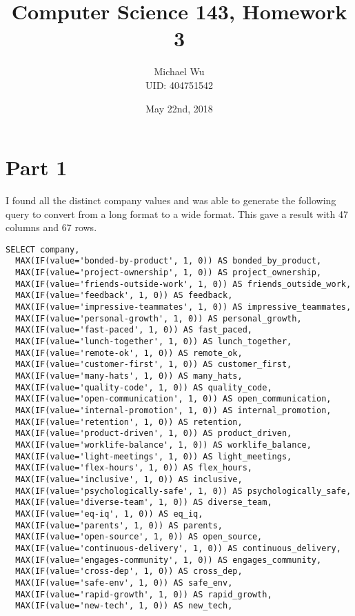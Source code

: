 \documentclass[12pt]{article}
\begin{document}
\title{Computer Science 143, Homework 3}
\date{May 22nd, 2018}
\author{Michael Wu\\UID: 404751542}
\maketitle

\section*{Part 1}

I found all the distinct company values and was able to generate the following query to convert from a long format to a wide format.
This gave a result with 47 columns and 67 rows.
{\footnotesize
\begin{verbatim}
SELECT company,
  MAX(IF(value='bonded-by-product', 1, 0)) AS bonded_by_product,
  MAX(IF(value='project-ownership', 1, 0)) AS project_ownership,
  MAX(IF(value='friends-outside-work', 1, 0)) AS friends_outside_work,
  MAX(IF(value='feedback', 1, 0)) AS feedback,
  MAX(IF(value='impressive-teammates', 1, 0)) AS impressive_teammates,
  MAX(IF(value='personal-growth', 1, 0)) AS personal_growth,
  MAX(IF(value='fast-paced', 1, 0)) AS fast_paced,
  MAX(IF(value='lunch-together', 1, 0)) AS lunch_together,
  MAX(IF(value='remote-ok', 1, 0)) AS remote_ok,
  MAX(IF(value='customer-first', 1, 0)) AS customer_first,
  MAX(IF(value='many-hats', 1, 0)) AS many_hats,
  MAX(IF(value='quality-code', 1, 0)) AS quality_code,
  MAX(IF(value='open-communication', 1, 0)) AS open_communication,
  MAX(IF(value='internal-promotion', 1, 0)) AS internal_promotion,
  MAX(IF(value='retention', 1, 0)) AS retention,
  MAX(IF(value='product-driven', 1, 0)) AS product_driven,
  MAX(IF(value='worklife-balance', 1, 0)) AS worklife_balance,
  MAX(IF(value='light-meetings', 1, 0)) AS light_meetings,
  MAX(IF(value='flex-hours', 1, 0)) AS flex_hours,
  MAX(IF(value='inclusive', 1, 0)) AS inclusive,
  MAX(IF(value='psychologically-safe', 1, 0)) AS psychologically_safe,
  MAX(IF(value='diverse-team', 1, 0)) AS diverse_team,
  MAX(IF(value='eq-iq', 1, 0)) AS eq_iq,
  MAX(IF(value='parents', 1, 0)) AS parents,
  MAX(IF(value='open-source', 1, 0)) AS open_source,
  MAX(IF(value='continuous-delivery', 1, 0)) AS continuous_delivery,
  MAX(IF(value='engages-community', 1, 0)) AS engages_community,
  MAX(IF(value='cross-dep', 1, 0)) AS cross_dep,
  MAX(IF(value='safe-env', 1, 0)) AS safe_env,
  MAX(IF(value='rapid-growth', 1, 0)) AS rapid_growth,
  MAX(IF(value='new-tech', 1, 0)) AS new_tech,

\end{verbatim}}
\end{document}
